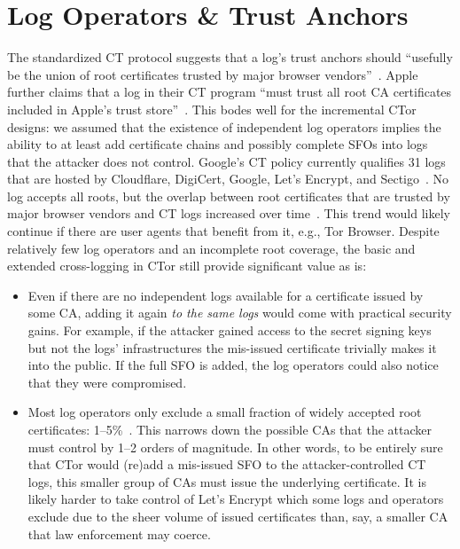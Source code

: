 \section{Log Operators \& Trust Anchors} \label{app:ct-trust-anchors}
The standardized CT protocol suggests that a log's trust anchors should
``usefully be the union of root certificates trusted by major browser
vendors''~\cite{ct,ct/bis}.  Apple further claims that a log in their CT program
``must trust all root CA certificates included in Apple's trust
store''~\cite{apple-log-policy}.  This bodes well for the incremental CTor
designs:
	we assumed that the existence of independent log operators implies the
	ability to at least add certificate chains and possibly complete SFOs
	into logs that the attacker does not control.
Google's CT policy currently qualifies 31 logs that are hosted by
	Cloudflare,
	DigiCert,
	Google,
	Let's Encrypt, and
	Sectigo~\cite{google-log-policy}.
No log accepts all roots, but the overlap between root certificates that are
trusted by major browser vendors and CT logs increased over
time~\cite{ct-root-landscape}.  This trend would likely continue if there are
user agents that benefit from it, e.g., Tor Browser.  Despite relatively few
log operators and an incomplete root coverage, the basic and extended
cross-logging in CTor still provide significant value as is:
\begin{itemize}
	\item Even if there are no independent logs available for a certificate
		issued by some CA, adding it again \emph{to the same logs} would come
		with practical security gains.  For example, if the attacker gained
		access to the secret signing keys but not the logs' infrastructures
		the mis-issued certificate trivially makes it into the public.  If the
		full SFO is added, the log operators could also notice that they were
		compromised.
	\item Most log operators only exclude a small fraction of widely accepted
		root certificates: 1--5\%~\cite{ct-root-landscape}.  This narrows down
		the possible CAs that the attacker must control by 1--2 orders of
		magnitude.  In other words, to be entirely sure that CTor would (re)add
		a mis-issued SFO to the attacker-controlled CT logs, this smaller group
		of CAs must issue the underlying certificate.  It is likely harder to
		take control of Let's Encrypt which some logs and operators exclude due
		to the sheer volume of issued certificates than, say, a smaller CA that
		law enforcement may coerce.
\end{itemize}

